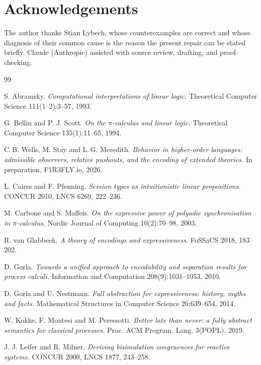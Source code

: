 \documentclass[11pt]{article}
\theoremstyle{definition}
\theoremstyle{plain}
\theoremstyle{remark}
\begin{document}
\section*{Acknowledgements}

The author thanks Stian Lybech, whose counterexamples are correct and
whose diagnosis of their common cause is the reason the present repair
can be stated briefly. Claude (Anthropic) assisted with source review,
drafting, and proof-checking.

\begin{thebibliography}{99}

 S. Abramsky.
\emph{Computational interpretations of linear logic.}
Theoretical Computer Science 111(1--2):3--57, 1993.

 G. Bellin and P. J. Scott.
\emph{On the $\pi$-calculus and linear logic.}
Theoretical Computer Science 135(1):11--65, 1994.

 C.\,B. Wells, M. Stay and L.\,G. Meredith.
\emph{Behavior in higher-order languages: admissible observers, relative
pushouts, and the encoding of extended theories.}
In preparation, F1R3FLY.io, 2026.

 L. Caires and F. Pfenning.
\emph{Session types as intuitionistic linear propositions.}
CONCUR 2010, LNCS 6269, 222--236.

 M. Carbone and S. Maffeis.
\emph{On the expressive power of polyadic synchronisation in $\pi$-calculus.}
Nordic Journal of Computing 10(2):70--98, 2003.

 R. van Glabbeek.
\emph{A theory of encodings and expressiveness.}
FoSSaCS 2018, 183--202.

 D. Gorla.
\emph{Towards a unified approach to encodability and separation results
for process calculi.}
Information and Computation 208(9):1031--1053, 2010.

 D. Gorla and U. Nestmann.
\emph{Full abstraction for expressiveness: history, myths and facts.}
Mathematical Structures in Computer Science 26:639--654, 2014.

 W. Kokke, F. Montesi and M. Peressotti.
\emph{Better late than never: a fully abstract semantics for classical
processes.}
Proc. ACM Program. Lang. 3(POPL), 2019.

 J. J. Leifer and R. Milner.
\emph{Deriving bisimulation congruences for reactive systems.}
CONCUR 2000, LNCS 1877, 243--258.


\end{thebibliography}
\end{document}
